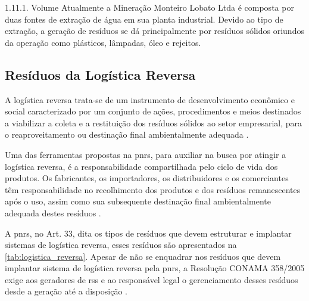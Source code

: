 	1.11.1. Volume
	Atualmente a Mineração Monteiro Lobato Ltda é composta por duas fontes de extração de água em sua planta industrial. Devido ao tipo de extração, a geração de resíduos se dá principalmente por resíduos sólidos oriundos da operação como plásticos, lâmpadas, óleo e rejeitos.
	
	
	\subsection{Resíduos da Logística Reversa}
	A logística reversa trata-se de um instrumento de desenvolvimento econômico e social caracterizado por um conjunto de ações, procedimentos e meios destinados a viabilizar a coleta e a restituição dos resíduos sólidos ao setor empresarial, para o reaproveitamento ou destinação final ambientalmente adequada \cite{brasil:12305}. 
	
	Uma das ferramentas propostas na \gls{pnrs}, para auxiliar na busca por atingir a logística reversa, é a responsabilidade compartilhada pelo ciclo de vida dos produtos. Os fabricantes, os importadores, os distribuidores e os comerciantes têm responsabilidade no recolhimento dos produtos e dos resíduos remanescentes após o uso, assim como sua subsequente destinação final ambientalmente adequada destes resíduos \cite{brasil:12305}.
	
	A \gls{pnrs}, no Art. 33, dita os tipos de resíduos que devem estruturar e implantar sistemas de logística reversa, esses resíduos são apresentados na \autoref{tab:logistica_reversa}. Apesar de não se enquadrar nos resíduos que devem implantar sistema de logística reversa pela \gls{pnrs}, a Resolução CONAMA 358/2005 exige aos geradores de \gls{rss} e ao responsável legal o gerenciamento desses resíduos desde a geração até a disposição \cite{conama:358}.
	
	
	
